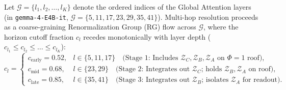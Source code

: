 \documentclass[11pt,letterpaper]{article}
\theoremstyle{definition}
\begin{document}
Let $\mathcal{G} = \{l_1, l_2, \dots, l_K\}$ denote the ordered indices of the Global Attention layers (in \texttt{gemma-4-E4B-it}, $\mathcal{G} = \{5, 11, 17, 23, 29, 35, 41\}$). Multi-hop resolution proceeds as a coarse-graining Renormalization Group (RG) flow across $\mathcal{G}$, where the horizon cutoff fraction $c_l$ recedes monotonically with layer depth ($c_{l_1} \le c_{l_2} \le \dots \le c_{l_K}$):
\begin{equation}
    c_l = \begin{cases}
        c_{\text{early}} = 0.52, & l \in \{5, 11, 17\} \quad \text{(Stage 1: Includes }\mathcal{Z}_C, \mathcal{Z}_B, \mathcal{Z}_A \text{ on }\Phi=1 \text{ roof)}, \\
        c_{\text{mid}}   = 0.68, & l \in \{23, 29\}    \quad \text{(Stage 2: Integrates out }\mathcal{Z}_C\text{; holds }\mathcal{Z}_B, \mathcal{Z}_A \text{ on roof)}, \\
        c_{\text{late}}  = 0.85, & l \in \{35, 41\}    \quad \text{(Stage 3: Integrates out }\mathcal{Z}_B\text{; isolates }\mathcal{Z}_A \text{ for readout)}.
    \end{cases}
    \label{eq:rg_schedule}
\end{equation}
\end{document}
